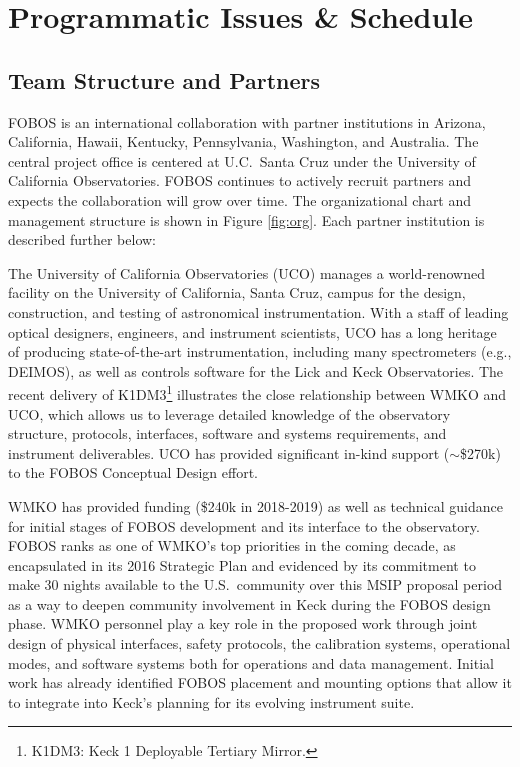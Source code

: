 \documentclass[oneside,11pt]{amsart}
\begin{document}
\bigskip
\section{Programmatic Issues \& Schedule}


\subsection{Team Structure and Partners}

FOBOS is an international collaboration with partner institutions in
Arizona, California, Hawaii, Kentucky, Pennsylvania, Washington, and
Australia. The central project office is centered at U.C.\ Santa Cruz
under the University of California Observatories. FOBOS continues to
actively recruit partners and expects the collaboration will grow
over time. The organizational chart and management structure is shown
in Figure \ref{fig:org}. Each partner institution is described
further below:

\medskip

The University of California Observatories (UCO) manages a
world-renowned facility on the University of California, Santa Cruz,
campus for the design, construction, and testing of astronomical
instrumentation. With a staff of leading optical designers,
engineers, and instrument scientists, UCO has a long heritage of
producing state-of-the-art instrumentation, including many
spectrometers (e.g., DEIMOS), as well as controls software for the
Lick and Keck Observatories. The recent delivery of
K1DM3\footnote{K1DM3: Keck 1 Deployable Tertiary Mirror.} illustrates
the close relationship between WMKO and UCO, which allows us to
leverage detailed knowledge of the observatory structure, protocols,
interfaces, software and systems requirements, and instrument
deliverables. UCO has provided significant in-kind support
($\sim$\$270k) to the FOBOS Conceptual Design effort.

 WMKO has provided funding
(\$240k in 2018-2019) as well as technical guidance for initial
stages of FOBOS development and its interface to the observatory.
FOBOS ranks as one of WMKO's top priorities in the coming decade, as
encapsulated in its 2016 Strategic Plan and evidenced by its
commitment to make 30 nights available to the U.S.\ community over
this MSIP proposal period as a way to deepen community involvement in
Keck during the FOBOS design phase. WMKO personnel play a key role in
the proposed work through joint design of physical interfaces, safety
protocols, the calibration systems, operational modes, and software
systems both for operations and data management. Initial work has
already identified FOBOS placement and mounting options that allow it
to integrate into Keck's planning for its evolving instrument suite.
\end{document}
